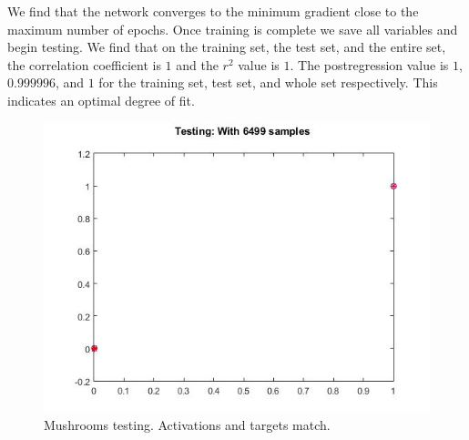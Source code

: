 \documentclass{article}%
\begin{document}
We find that the network converges to the minimum gradient close to the maximum number of epochs. Once training is complete we save all variables and begin testing. We find that on the training set, the test set, and the entire set, the correlation coefficient is $1$ and the $r^2$ value is $1$. The postregression value is $1$, $0.999996$, and $1$ for the training set, test set, and whole set respectively. This indicates an optimal degree of fit.
\begin{figure}[H]
\centering
\includegraphics[scale=0.3]{Mushrooms/testing.jpg}
\caption{Mushrooms testing. Activations and targets match.}
\label{fig:mushtest}
\end{figure}
\end{document}
